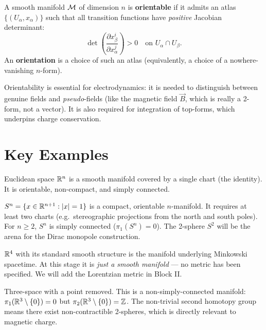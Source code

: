 \begin{definition}
A smooth manifold $\mathcal{M}$ of dimension $n$ is \textbf{orientable} if it admits an atlas $\{(U_\alpha, x_\alpha)\}$ such that all transition functions have \emph{positive} Jacobian determinant:
\begin{equation}
\det\!\left(\frac{\partial x_\beta^i}{\partial x_\alpha^j}\right) > 0 \quad \text{on } U_\alpha \cap U_\beta.
\end{equation}
An \textbf{orientation} is a choice of such an atlas (equivalently, a choice of a nowhere-vanishing $n$-form).
\end{definition}

Orientability is essential for electrodynamics: it is needed to distinguish between genuine fields and \emph{pseudo}-fields (like the magnetic field $\vec{B}$, which is really a 2-form, not a vector). It is also required for integration of top-forms, which underpins charge conservation.

\section{Key Examples}

\begin{example}[$\R^n$]
Euclidean space $\R^n$ is a smooth manifold covered by a single chart (the identity). It is orientable, non-compact, and simply connected.
\end{example}

\begin{example}
$S^n = \{x \in \mathbb{R}^{n+1} : |x| = 1\}$ is a compact, orientable $n$-manifold. It requires at least two charts (e.g.\ stereographic projections from the north and south poles). For $n \geq 2$, $S^n$ is simply connected ($\pi_1(S^n) = 0$). The 2-sphere $S^2$ will be the arena for the Dirac monopole construction.
\end{example}

\begin{example}
$\mathbb{R}^4$ with its standard smooth structure is the manifold underlying Minkowski spacetime. At this stage it is \emph{just a smooth manifold} --- no metric has been specified. We will add the Lorentzian metric in Block II.
\end{example}

\begin{example}[$\R^3 \setminus \{0\}$]
Three-space with a point removed. This is a non-simply-connected manifold: $\pi_1(\mathbb{R}^3 \setminus \{0\}) = 0$ but $\pi_2(\mathbb{R}^3 \setminus \{0\}) = \mathbb{Z}$. The non-trivial second homotopy group means there exist non-contractible 2-spheres, which is directly relevant to magnetic charge.
\end{example}

